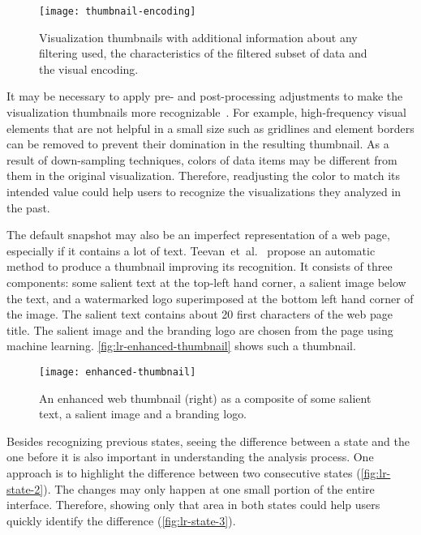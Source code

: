 \begin{figure}[!htb]
	\centering
	\texttt{[image: thumbnail-encoding]}
	\caption{Visualization thumbnails with additional information about any filtering used, the characteristics of the filtered subset of data and the visual encoding. }
	\label{fig:lr-thumbnail-encoding}
\end{figure}

It may be necessary to apply pre- and post-processing adjustments to make the visualization thumbnails more recognizable~\cite{Heer2008}. For example, high-frequency visual elements that are not helpful in a small size such as gridlines and element borders can be removed to prevent their domination in the resulting thumbnail. As a result of down-sampling techniques, colors of data items may be different from them in the original visualization. Therefore, readjusting the color to match its intended value could help users to recognize the visualizations they analyzed in the past.

The default snapshot may also be an imperfect representation of a web page, especially if it contains a lot of text. Teevan~et~al.~\cite{Teevan2009} propose an automatic method to produce a thumbnail improving its recognition. It consists of three components: some salient text at the top-left hand corner, a salient image below the text, and a watermarked logo superimposed at the bottom left hand corner of the image. The salient text contains about 20 first characters of the web page title. The salient image and the branding logo are chosen from the page using machine learning. \autoref{fig:lr-enhanced-thumbnail} shows such a thumbnail.

\begin{figure}[!htb]
	\centering
	\texttt{[image: enhanced-thumbnail]}
	\caption{An enhanced web thumbnail (right) as a composite of some salient text, a salient image and a branding logo. }
	\label{fig:lr-enhanced-thumbnail}
\end{figure}

Besides recognizing previous states, seeing the difference between a state and the one before it is also important in understanding the analysis process. One approach is to highlight the difference between two consecutive states (\autoref{fig:lr-state-2}). The changes may only happen at one small portion of the entire interface. Therefore, showing only that area in both states could help users quickly identify the difference (\autoref{fig:lr-state-3}).

